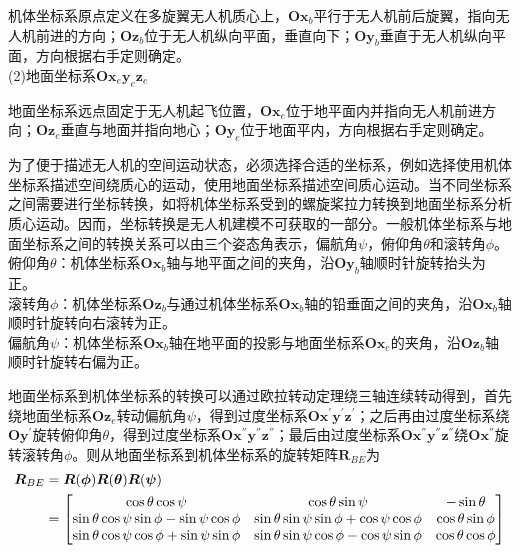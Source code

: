 机体坐标系原点定义在多旋翼无人机质心上，$\boldsymbol{O} \boldsymbol{x}_b$平行于无人机前后旋翼，指向无人机前进的方向；$\boldsymbol{O} \boldsymbol{z}_b$位于无人机纵向平面，垂直向下；$\boldsymbol{O} \boldsymbol{y}_b$垂直于无人机纵向平面，方向根据右手定则确定。 \\ 
(2)地面坐标系$\boldsymbol{O} \boldsymbol{x}_e \boldsymbol{y}_e \boldsymbol{z}_e$

地面坐标系远点固定于无人机起飞位置，$\boldsymbol{O} \boldsymbol{x}_e$位于地平面内并指向无人机前进方向；$\boldsymbol{O} \boldsymbol{z}_e$垂直与地面并指向地心；$\boldsymbol{O} \boldsymbol{y}_e$位于地面平内，方向根据右手定则确定。

为了便于描述无人机的空间运动状态，必须选择合适的坐标系，例如选择使用机体坐标系描述空间绕质心的运动，使用地面坐标系描述空间质心运动。当不同坐标系之间需要进行坐标转换，如将机体坐标系受到的螺旋桨拉力转换到地面坐标系分析质心运动。因而，坐标转换是无人机建模不可获取的一部分。一般机体坐标系与地面坐标系之间的转换关系可以由三个姿态角表示，偏航角$\psi$，俯仰角$\theta$和滚转角$\phi$。\\
俯仰角$\theta$：机体坐标系$\boldsymbol{O} \boldsymbol{x}_b$轴与地平面之间的夹角，沿$\boldsymbol{O} \boldsymbol{y}_b$轴顺时针旋转抬头为正。\\
滚转角$\phi$：机体坐标系$\boldsymbol{O} \boldsymbol{z}_b$与通过机体坐标系$\boldsymbol{O} \boldsymbol{x}_b$轴的铅垂面之间的夹角，沿$\boldsymbol{O} \boldsymbol{x}_b$轴顺时针旋转向右滚转为正。\\
偏航角$\psi$：机体坐标系$\boldsymbol{O} \boldsymbol{x}_b$轴在地平面的投影与地面坐标系$\boldsymbol{O} \boldsymbol{x}_e$的夹角，沿$\boldsymbol{O} \boldsymbol{z}_b$轴顺时针旋转右偏为正。

地面坐标系到机体坐标系的转换可以通过欧拉转动定理绕三轴连续转动得到，首先绕地面坐标系$\boldsymbol{O} \boldsymbol{z}_e$转动偏航角$\psi$，得到过度坐标系$\boldsymbol{O} \boldsymbol{x}^{'} \boldsymbol{y}^{'} \boldsymbol{z}^{'}$；之后再由过度坐标系绕$\boldsymbol{O} \boldsymbol{y}^{'}$旋转俯仰角$\theta$，得到过度坐标系$\boldsymbol{O} \boldsymbol{x}^{''} \boldsymbol{y}^{''} \boldsymbol{z}^{''}$；最后由过度坐标系$\boldsymbol{O} \boldsymbol{x}^{''} \boldsymbol{y}^{''} \boldsymbol{z}^{''}$绕$\boldsymbol{O} \boldsymbol{x}^{''}$旋转滚转角$\phi$。则从地面坐标系到机体坐标系的旋转矩阵$\boldsymbol{R}_{BE}$为
\begin{equation}
\label{equ2.1}
\begin{aligned}
\boldsymbol{R}_{BE} 
&= \boldsymbol{R}(\boldsymbol{\phi}) \boldsymbol{R}(\boldsymbol{\theta}) \boldsymbol{R}(\boldsymbol{\psi}) \\ 
&= 
\begin{bmatrix}
\cos\theta \cos\psi & \cos\theta \sin\psi & -\sin\theta \cr
\sin\theta \cos\psi \sin\phi - \sin\psi \cos\phi & \sin\theta \sin\psi \sin\phi + \cos\psi \cos\phi & \cos\theta \sin\phi \cr
\sin\theta \cos\psi \cos\phi + \sin\psi \sin\phi & \sin\theta \sin\psi \cos\phi - \cos\psi \sin\phi & \cos\theta \cos\phi \cr
\end{bmatrix}
\end{aligned}
\end{equation}

